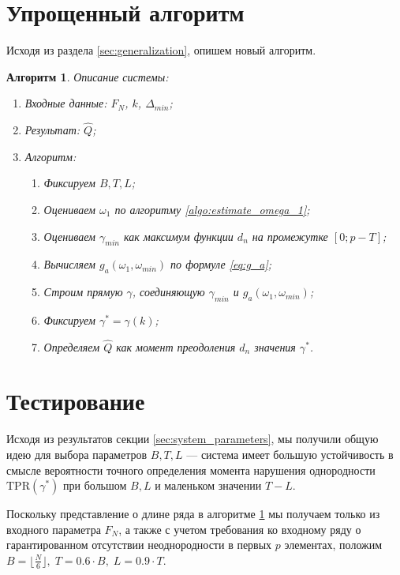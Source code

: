 \documentclass[specialist, substylefile = spbu.rtx,
			   subf, href, 12pt]{disser}
\newtheorem{algorithm}{Алгоритм}
\begin{document}
\section{Упрощенный алгоритм}
Исходя из раздела \ref{sec:generalization}, опишем новый алгоритм.
\begin{algorithm}\label{algo:system_simplification}
	Описание системы:
	\begin{enumerate}
		\item Входные данные: $ F_N $, $ k $, $ \Delta_{min} $;
		\item Результат: $ \hat{Q}$;
		\item Алгоритм:
		\begin{enumerate}
			\item Фиксируем $ B, T, L $;
			\item Оцениваем $ \omega_1 $ по алгоритму \ref{algo:estimate_omega_1};
			\item Оцениваем $ \gamma_{min} $ как максимум функции $ d_n $ на промежутке $ [0; p - T] $;
			\item Вычисляем $ g_a(\omega_1, \omega_{min}) $ по формуле \eqref{eq:g_a};
			\item Строим прямую $ \gamma $, соединяющую $ \gamma_{min} $ и $ g_a(\omega_1, \omega_{min}) $;
			\item Фиксируем $ \gamma^* = \gamma(k) $;
			\item Определяем $ \hat{Q} $ как момент преодоления $ d_n $ значения $ \gamma^* $.
		\end{enumerate}
	\end{enumerate}
\end{algorithm}


\section{Тестирование}
Исходя из результатов секции \ref{sec:system_parameters}, мы получили общую идею для выбора параметров $ B, T, L $ --- система имеет большую устойчивость в смысле вероятности точного определения момента нарушения однородности $ \mathrm{TPR}(\gamma^*) $ при большом $ B, L $ и маленьком значении $ T - L $. 

Поскольку представление о длине ряда в алгоритме \ref{algo:system_simplification} мы получаем только из входного параметра $ F_N $, а также с учетом требования ко входному ряду о гарантированном отсутствии неоднородности в первых $ p $ элементах, положим $ B = \lfloor \frac{N}{6} \rfloor,\; T = 0.6 \cdot B,\; L = 0.9 \cdot T $.
\end{document}
